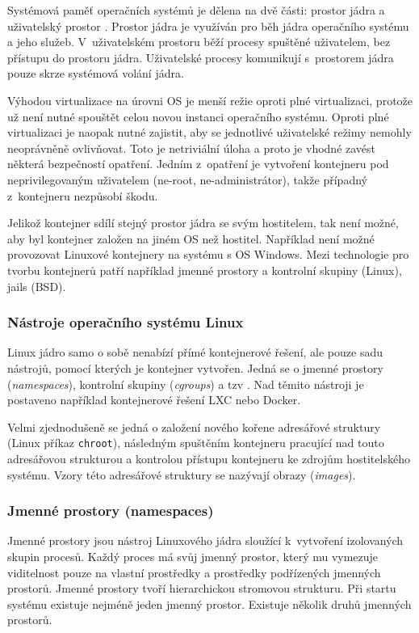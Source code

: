 Systémová paměť operačních systémů je dělena na dvě části: prostor jádra a uživatelský prostor \cite{memory_spaces}.
Prostor jádra je využíván pro běh jádra operačního systému a jeho služeb.
V~uživatelském prostoru běží procesy spuštěné uživatelem, bez přístupu do prostoru jádra.
Uživatelské procesy komunikují s~prostorem jádra pouze skrze systémová volání jádra.

Výhodou virtualizace na úrovni OS je menší režie oproti plné virtualizaci, protože už není nutné spouštět celou novou instanci operačního systému.
Oproti plné virtualizaci je naopak nutné zajistit, aby se jednotlivé uživatelské režimy nemohly neoprávněně ovlivňovat.
Toto je netriviální úloha a proto je vhodné zavést některá bezpečností opatření.
Jedním z~opatření je vytvoření kontejneru pod neprivilegovaným uživatelem (ne-root, ne-administrátor), takže případný  z~kontejneru nezpůsobí škodu.

Jelikož kontejner sdílí stejný prostor jádra se svým hostitelem, tak není možné, aby byl kontejner založen na jiném OS než hostitel.
Například není možné provozovat Linuxové kontejnery na systému s OS Windows.
Mezi technologie pro tvorbu kontejnerů patří například jmenné prostory a kontrolní skupiny (Linux), jails (BSD).

\subsubsection{Nástroje operačního systému Linux}

Linux jádro samo o sobě nenabízí přímé kontejnerové řešení, ale pouze sadu nástrojů, pomocí kterých je kontejner vytvořen.
Jedná se o jmenné prostory (\textit{namespaces}), kontrolní skupiny (\textit{cgroups}) a tzv .
Nad těmito nástroji je postaveno například kontejnerové řešení LXC nebo Docker.

Velmi zjednodušeně se jedná o založení nového kořene adresářové struktury (Linux příkaz \verb|chroot|), následným spuštěním kontejneru pracující nad touto adresářovou strukturou a kontrolou přístupu kontejneru ke zdrojům hostitelského systému.
Vzory této adresářové struktury se nazývají obrazy (\textit{images}).

\subsubsection{Jmenné prostory (namespaces)}

Jmenné prostory \cite{namespaces} jsou nástroj Linuxového jádra sloužící k~vytvoření izolovaných skupin procesů.
Každý proces má svůj jmenný prostor, který mu vymezuje viditelnost pouze na vlastní prostředky a prostředky podřízených jmenných prostorů.
Jmenné prostory tvoří hierarchickou stromovou strukturu.
Při startu systému existuje nejméně jeden jmenný prostor.
Existuje několik druhů jmenných prostorů.

